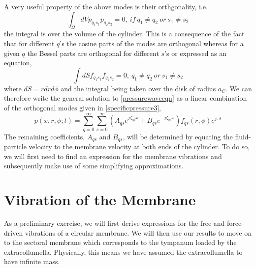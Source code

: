 A very useful property of the above modes is their orthgonality, i.e.
\begin{equation}\label{pressureorthogonality}
 \int_\Omega dVp_{q_1s_1}p_{q_2s_2}=0,\ if\ q_1\neq q_2\ or\ s_1\neq s_2
\end{equation}
the integral is over the volume of the cylinder. This is a consequence of the fact that for different $q$'s
the cosine parts of the modes are orthogonal whereas for a given $q$ the Bessel parts are orthogonal for
different $s$'s or expressed as an equation,
\begin{equation}\label{besselorthogonality}
 \int dS f_{q_1s_1}f_{q_2s_2}=0,\ q_1\neq q_2\ or\ s_1\neq s_2
\end{equation}
where $dS=rdrd\phi$ and the integral being taken over the disk of radius $a_C$.
We can therefore write the general solution to \eqref{pressurewaveeqn} as a linear combination of the orthogonal modes given in \eqref{specificpressure3},
\begin{equation}\label{pressuregeneral1}
 p(x,r,\phi;t)=\displaystyle\sum^\infty_{q=0}\displaystyle\sum^\infty_{s=0}\left(A_{qs}e^{j\zeta_{qs}x}+B_{qs}e^{-j\zeta_{qs}x}\right)f_{qs}(r,\phi)e^{j\omega t}
\end{equation}
The remaining coefficients, $A_{qs}$ and $B_{qs}$, will be determined by equating the fluid-particle velocity to
the membrane velocity at both ends of the cylinder. To do so, we will first need to find an expression
for the membrane vibrations and subsequently make use of some simplifying approximations.

\section{Vibration of the Membrane}
As a preliminary exercise, we will first derive expressions for the free and force-driven
vibrations of a circular membrane. We will then use our results to move on to the sectoral membrane 
which corresponds to the tympanum loaded by the extracollumella. Physically, this means we have
assumed the extracollumella to have infinite mass. 
